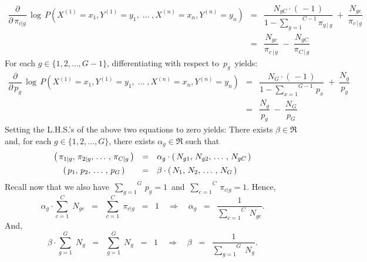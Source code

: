 \begin{eqnarray*}
\dfrac{\partial}{\partial\,\pi_{c \vert g}}\,
\log\,P\!\left(X^{(1)} = x_{1},Y^{(1)}=y_{1}, \;\ldots\; ,X^{(n)} = x_{n},Y^{(n)}=y_{n}\right)
&=&
	\dfrac{N_{gC}\cdot(\,-1\,)}{1 - \overset{C-1}{\underset{y=1}{\sum}}\pi_{y\,\vert\,g}}
	\; + \;
	\dfrac{N_{gc}}{\pi_{c\,\vert\,g}}
\\
&=&
	\dfrac{N_{gc}}{\pi_{c\,\vert\,g}}
	\; - \;
	\dfrac{N_{gC}}{\pi_{C\,\vert\,g}}
\end{eqnarray*}
For each $g \in \{1,2,\ldots,G-1\}$, differentiating with respect to \,$p_{g}$\, yields:
\begin{eqnarray*}
\dfrac{\partial}{\partial\,p_{g}}\,
\log\,P\!\left(X^{(1)} = x_{1},Y^{(1)}=y_{1}, \;\ldots\; ,X^{(n)} = x_{n},Y^{(n)}=y_{n}\right)
&=&
	\dfrac{N_{G}\cdot(\,-1\,)}{1 - \overset{G-1}{\underset{x=1}{\sum}}\,p_{x}}
	\; + \;
	\dfrac{N_{g}}{p_{g}}
\\
&=&
	\dfrac{N_{g}}{p_{g}}
	\; - \;
	\dfrac{N_{G}}{p_{G}}
\end{eqnarray*}
Setting the L.H.S.'s of the above two equations to zero yields:
There exists $\beta \in \Re$ and, 
for each $g \in \{1,2,\ldots,G\}$, there exists $\alpha_{g} \in \Re$ such that
\begin{equation*}
	\begin{array}{ccl}
	\left(\,\pi_{1\vert g},\,\pi_{2\vert g}, \,\ldots\,, \,\pi_{C\vert g}\,\right)
	& = & \alpha_{g} \cdot \left(\,N_{g1},\,N_{g2}, \,\ldots\,,\, N_{gC}\,\right)
	\\
	\left(\,p_{1},\,p_{2}, \,\ldots\,, \,p_{G}\,\right)
	& \overset{{\color{white}\vert}}{=} & \beta \cdot \left(\,N_{1},\, N_{2}, \,\ldots\,,\, N_{G}\,\right)
	\end{array}
\end{equation*}
Recall now that we also have
\,$\overset{G}{\underset{g=1}{\sum}}\,p_{g} = 1$\, and
\,$\overset{C}{\underset{c=1}{\sum}}\,\pi_{c\vert g} = 1$.
Hence,
\begin{equation*}
\alpha_{g} \cdot \overset{C}{\underset{c=1}{\sum}}\;N_{gc}
\;\; = \;\; \overset{C}{\underset{c=1}{\sum}}\;\pi_{c\vert g}
\;\; = \;\; 1
\quad\Longrightarrow\quad
\alpha_{g} \;\;=\;\; \dfrac{1}{\overset{C}{\underset{c=1}{\sum}}\;N_{gc}}.
\end{equation*}
And,
\begin{equation*}
\beta \cdot \overset{G}{\underset{g=1}{\sum}}\;N_{g}
\;\; = \;\; \overset{G}{\underset{g=1}{\sum}}\;N_{g}
\;\; = \;\; 1
\quad\Longrightarrow\quad
\beta \;\;=\;\; \dfrac{1}{\overset{G}{\underset{g=1}{\sum}}\;N_{g}}.
\end{equation*}
